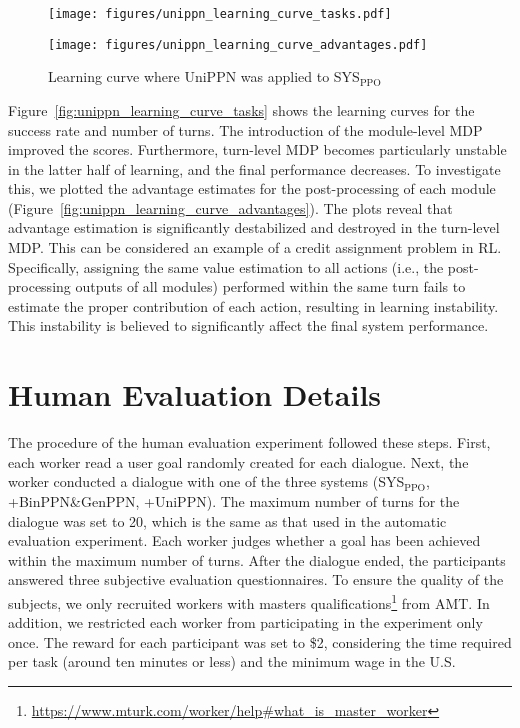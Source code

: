 \begin{figure}[tbp]
\begin{minipage}[t]{1\linewidth}
\centering
\texttt{[image: figures/unippn\_learning\_curve\_tasks.pdf]}
\label{fig:unippn_learning_curve_tasks}
\end{minipage}
\begin{minipage}[t]{1\linewidth}
\centering
\texttt{[image: figures/unippn\_learning\_curve\_advantages.pdf]}
\label{fig:unippn_learning_curve_advantages}
\end{minipage} 
\caption{Learning curve where UniPPN was applied to SYS$_{\text{PPO}}$}
\label{fig:unippn_learning_curve}
\end{figure}

Figure~\ref{fig:unippn_learning_curve_tasks} shows the learning curves for the success rate and number of turns. The introduction of the module-level MDP improved the scores. Furthermore, turn-level MDP becomes particularly unstable in the latter half of learning, and the final performance decreases. To investigate this, we plotted the advantage estimates for the post-processing of each module (Figure~\ref{fig:unippn_learning_curve_advantages}). The plots reveal that advantage estimation is significantly destabilized and destroyed in the turn-level MDP. This can be considered an example of a credit assignment problem in RL. Specifically, assigning the same value estimation to all actions (i.e., the post-processing outputs of all modules) performed within the same turn fails to estimate the proper contribution of each action,  resulting in learning instability. This instability is believed to significantly affect the final system performance.

\section{Human Evaluation Details}
\label{appendix:sec:human_evaluation_detail}
The procedure of the human evaluation experiment followed these steps. First, each worker read a user goal randomly created for each dialogue. Next, the worker conducted a dialogue with one of the three systems (SYS$_\text{PPO}$, +BinPPN\&GenPPN, +UniPPN). The maximum number of turns for the dialogue was set to 20, which is the same as that used in the automatic evaluation experiment. Each worker judges whether a goal has been achieved within the maximum number of turns. After the dialogue ended, the participants answered three subjective evaluation questionnaires. To ensure the quality of the subjects, we only recruited workers with masters qualifications\footnote{\url{https://www.mturk.com/worker/help#what_is_master_worker}} from AMT. In addition, we restricted each worker from participating in the experiment only once. The reward for each participant was set to \$2, considering the time required per task (around ten minutes or less) and the minimum wage in the U.S.

